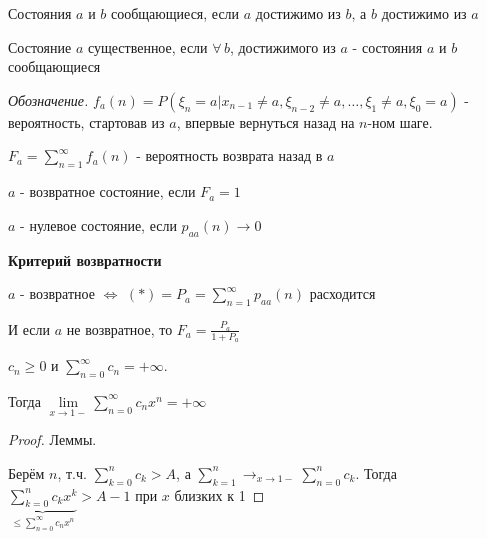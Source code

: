 \begin{definition}
    Состояния $a$ и $b$ сообщающиеся, если $a$ достижимо из $b$, а $b$ достижимо из $a$
\end{definition}

\begin{definition}
    Состояние $a$ существенное, если $\forall \, b$, достижимого из $a$ - состояния $a$ и $b$ сообщающиеся
\end{definition}

\textit{Обозначение. } $f_{a} (n) = P(\xi_n = a | x_{n - 1} \neq a, \xi_{n - 2} \neq a, \ldots, \xi_1 \neq a, \xi_0 = a)$ - вероятность, стартовав из $a$, впервые вернуться назад на $n$-ном шаге.

$F_a = \sum\limits_{n = 1}^\infty f_{a} (n)$ - вероятность возврата назад в $a$

\begin{definition}
    $a$ - возвратное состояние, если $F_a = 1$
\end{definition}

\begin{definition}
    $a$ - нулевое состояние, если $p_{aa} (n) \rightarrow 0$
\end{definition}

\begin{theorem}
    \textbf{Критерий возвратности}

    $a$ - возвратное $\Longleftrightarrow$ $(*) = P_a = \sum\limits_{n = 1}^\infty p_{aa} (n)$ расходится

    И если $a$ не возвратное, то $F_a = \frac{P_a}{1 + P_a}$
\end{theorem}

\begin{lemma}
    $c_n \geqslant 0$ и $\sum_{n=0}^{\infty} c_n = +\infty$. 

    Тогда $\lim\limits_{x\to 1-} \sum_{n=0}^{\infty} c_nx^n = +\infty$
\end{lemma}

\begin{proof} Леммы.


    Берём $n$, т.ч. $\sum_{k=0}^{n} c_k > A$, а $\sum_{k=1}^{n} \rightarrow_{x\to 1-} \sum_{n=0}^{n}c_k$. Тогда
    $\underbrace{\sum_{k=0}^{n} c_kx^k}_{\leqslant \sum_{n=0}^{\infty} c_nx^n} > A - 1$ при $x$ близких к 1
\end{proof}

